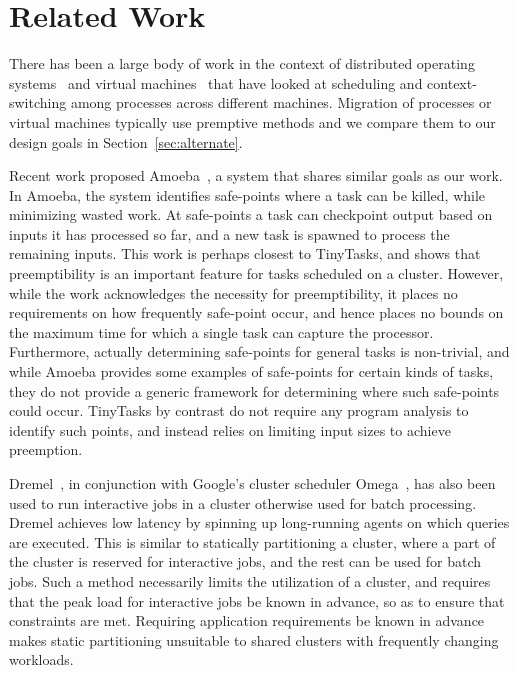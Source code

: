 \section{Related Work}

There has been a large body of work in the context of distributed operating 
systems~\cite{douglis1991transparent, milojivcic2000process, amoeba-os, chorus} 
and virtual machines~\cite{xen, something} that have looked at scheduling and
context-switching among processes across different machines. Migration of
processes or virtual machines typically use premptive methods and we compare
them to our design goals in Section~\ref{sec:alternate}.

Recent work proposed Amoeba~\cite{ananthanarayanan2012true}, a system that
shares similar goals as our work. In Amoeba, the system identifies safe-points
where a task can be killed, while minimizing wasted work. At safe-points a task
can checkpoint output based on inputs it has processed so far, and a new task is
spawned to process the remaining inputs. This work is perhaps closest to
TinyTasks, and shows that preemptibility is an important feature for tasks
scheduled on a cluster.  However, while the work acknowledges the necessity for
preemptibility, it places no requirements on how frequently safe-point occur,
and hence places no bounds on the maximum time for which a single task can
capture the processor.  Furthermore, actually determining safe-points for
general tasks is non-trivial, and while Amoeba provides some examples of
safe-points for certain kinds of tasks, they do not provide a generic framework
for determining where such safe-points could occur.  TinyTasks by contrast do
not require any program analysis to identify such points, and instead relies on
limiting input sizes to achieve preemption.

Dremel~\cite{melnik2010dremel}, in conjunction with Google's cluster scheduler
Omega~\cite{wilkes-berkeley}, has also been used to run interactive jobs in a
cluster otherwise used for batch processing. Dremel achieves low latency by
spinning up long-running agents on which queries are executed. This is similar
to statically partitioning a cluster, where a part of the cluster is reserved
for interactive jobs, and the rest can be used for batch jobs. Such a method
necessarily limits the utilization of a cluster, and requires that the peak load
for interactive jobs be known in advance, so as to ensure that constraints are
met. Requiring application requirements be known in advance makes static
partitioning unsuitable to shared clusters with frequently changing workloads.

